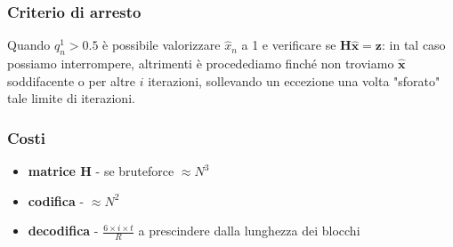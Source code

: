 \documentclass{article}
\begin{document}
	\subsubsection{Criterio di arresto}
	Quando $q^1_n >0.5$ è possibile valorizzare $\hat{x}_n$ a 1  e verificare se $\textbf{H}\hat{\textbf{x}}=\textbf{z}$: in tal caso possiamo interrompere, altrimenti è procedediamo finché non troviamo $\hat{\textbf{x}}$ soddifacente o per altre $i$ iterazioni, sollevando un eccezione una volta "sforato" tale limite di iterazioni.
	\subsubsection{Costi}
	\begin{itemize}
		\item \textbf{matrice H} - se bruteforce $\approx N^3$
		\item \textbf{codifica} - $\approx N^2$
		\item \textbf{decodifica} - $ \frac{6 \times i \times t}{R} $ a prescindere dalla lunghezza dei blocchi
	\end{itemize}
\end{document}

